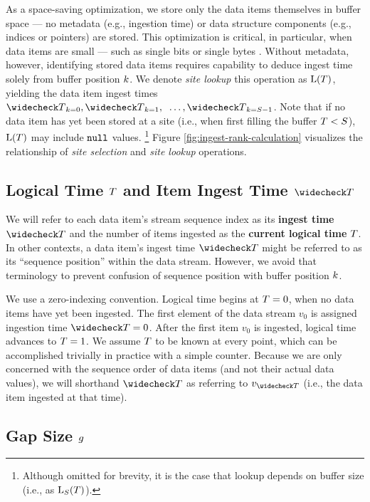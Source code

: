 As a space-saving optimization, we store only the data items themselves in buffer space --- no metadata (e.g., ingestion time) or data structure components (e.g., indices or pointers) are stored.
This optimization is critical, in particular, when data items are small --- such as single bits or single bytes \citep{moreno2022hereditary}.
Without metadata, however, identifying stored data items requires capability to deduce ingest time solely from buffer position $\colork$.
We denote \textit{site lookup} this operation as $\colorL(\colorT)$, yielding the data item ingest times $\colorTbar_{\colork=0}, \colorTbar_{\colork=1}, \;\;\ldots, \colorTbar_{\colork=\colorS-1}$.
Note that if no data item has yet been stored at a site (i.e., when first filling the buffer $\colorT < \colorS$), $\colorL(\colorT)$ may include $\texttt{null}$ values.%
\footnote{%
Although omitted for brevity, it is the case that lookup depends on buffer size (i.e., as $\colorL_{\colorS}(\colorT)$).
}
Figure \ref{fig:ingest-rank-calculation} visualizes the relationship of \textit{site selection} and \textit{site lookup} operations.

\subsection{Logical Time $\colorT$ and Item Ingest Time $\colorTbar$}
\label{sec:notation-time}

We will refer to each data item's stream sequence index as its \textbf{ingest time} $\colorTbar$ and the number of items ingested as the \textbf{current logical time} $\colorT$.
In other contexts, a data item's ingest time $\colorTbar$ might be referred to as its ``sequence position'' within the data stream.
However, we avoid that terminology to prevent confusion of sequence position with buffer position $\colork$.

We use a zero-indexing convention.
Logical time begins at $\colorT=0$, when no data items have yet been ingested.
The first element of the data stream $v_0$ is assigned ingestion time $\colorTbar=0$.
After the first item $v_0$ is ingested, logical time advances to $\colorT=1$.
We assume $\colorT$ to be known at every point, which can be accomplished trivially in practice with a simple counter.
Because we are only concerned with the sequence order of data items (and not their actual data values), we will shorthand $\colorTbar$ as referring to $v_{\colorTbar}$ (i.e., the data item ingested at that time).

\subsection{Gap Size $\colorg$}
\label{sec:notation-gapsize}

